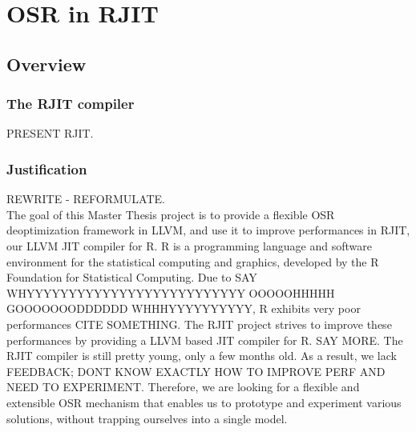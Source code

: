 
\chapter{OSR in RJIT} %

\label{Chapter4New} %


\newcommand{\keyword}[1]{\textbf{#1}}
\newcommand{\tabhead}[1]{\textbf{#1}}
\newcommand{\code}[1]{\texttt{#1}}
\newcommand{\file}[1]{\texttt{\bfseries#1}}
\newcommand{\option}[1]{\texttt{\itshape#1}}

\section{Overview}
\subsection{The RJIT compiler}
PRESENT RJIT.

\subsection{Justification}
REWRITE - REFORMULATE.\\
            

The goal of this Master Thesis project is to provide a flexible OSR deoptimization framework in LLVM, and use it to improve performances in RJIT, our LLVM JIT compiler for R.
R is a programming language and software environment for the statistical computing and graphics, developed by the R Foundation for Statistical Computing\cite{RURL}.
Due to SAY WHYYYYYYYYYYYYYYYYYYYYYYYYYY OOOOOHHHHH GOOOOOOODDDDDD WHHHYYYYYYYYYY, R exhibits very poor performances CITE SOMETHING.
The RJIT project strives to improve these performances by providing a LLVM based JIT compiler for R. SAY MORE.
The RJIT compiler is still pretty young, only a few months old.
As a result, we lack FEEDBACK; DONT KNOW EXACTLY HOW TO IMPROVE PERF AND NEED TO EXPERIMENT.
Therefore, we are looking for a flexible and extensible OSR mechanism that enables us to prototype and experiment various solutions, without trapping ourselves into a single model.\\

